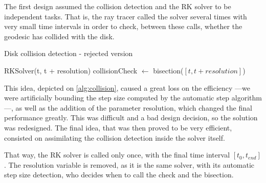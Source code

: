 The first design assumed the collision detection and the \ac{RK} solver to be independent tasks. That is, the ray tracer called the solver several times with very small time intervals in order to check, between these calls, whether the geodesic has collided with the disk.

\begin{algorithm}
	\caption{Disk collision detection - rejected version}
	\label{alg:collision}
	\begin{algorithmic}[1]
		\State RKSolver(t, t + resolution)
			\State collisionCheck $\gets$ bisection($[t, t + resolution]$)
		\EndIf
		\EndFor
		\EndFunction
	\end{algorithmic}
\end{algorithm}

This idea, depicted on \ref{alg:collision}, caused a great loss on the efficiency ---we were artificially bounding the step size computed by the automatic step algorithm---, as well as the addition of the parameter resolution, which changed the final performance greatly. This was difficult and a bad design decision, so the solution was redesigned. The final idea, that was then proved to be very efficient, consisted on assimilating the collision detection inside the solver itself.

That way, the \ac{RK} solver is called only once, with the final time interval $[t_0, t_{end}]$. The resolution variable is removed, as it is the same solver, with its automatic step size detection, who decides when to call the check and the bisection.